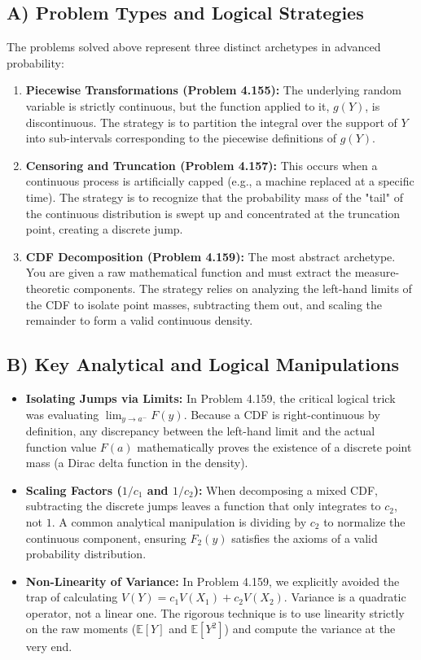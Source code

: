 \documentclass[11pt, a4paper]{article}
\theoremstyle{definition}
\theoremstyle{remark}
\newcommand{\E}{\mathbb{E}}
\begin{document}
\subsection{A) Problem Types and Logical Strategies}
The problems solved above represent three distinct archetypes in advanced probability:
\begin{enumerate}
    \item \textbf{Piecewise Transformations (Problem 4.155):} The underlying random variable is strictly continuous, but the function applied to it, $g(Y)$, is discontinuous. The strategy is to partition the integral over the support of $Y$ into sub-intervals corresponding to the piecewise definitions of $g(Y)$.
    \item \textbf{Censoring and Truncation (Problem 4.157):} This occurs when a continuous process is artificially capped (e.g., a machine replaced at a specific time). The strategy is to recognize that the probability mass of the "tail" of the continuous distribution is swept up and concentrated at the truncation point, creating a discrete jump.
    \item \textbf{CDF Decomposition (Problem 4.159):} The most abstract archetype. You are given a raw mathematical function and must extract the measure-theoretic components. The strategy relies on analyzing the left-hand limits of the CDF to isolate point masses, subtracting them out, and scaling the remainder to form a valid continuous density.
\end{enumerate}

\subsection{B) Key Analytical and Logical Manipulations}
\begin{itemize}
    \item \textbf{Isolating Jumps via Limits:} In Problem 4.159, the critical logical trick was evaluating $\lim_{y \to a^-} F(y)$. Because a CDF is right-continuous by definition, any discrepancy between the left-hand limit and the actual function value $F(a)$ mathematically proves the existence of a discrete point mass (a Dirac delta function in the density).
    \item \textbf{Scaling Factors ($1/c_1$ and $1/c_2$):} When decomposing a mixed CDF, subtracting the discrete jumps leaves a function that only integrates to $c_2$, not $1$. A common analytical manipulation is dividing by $c_2$ to normalize the continuous component, ensuring $F_2(y)$ satisfies the axioms of a valid probability distribution.
    \item \textbf{Non-Linearity of Variance:} In Problem 4.159, we explicitly avoided the trap of calculating $V(Y) = c_1 V(X_1) + c_2 V(X_2)$. Variance is a quadratic operator, not a linear one. The rigorous technique is to use linearity strictly on the raw moments ($\E[Y]$ and $\E[Y^2]$) and compute the variance at the very end.
\end{itemize}
\end{document}
